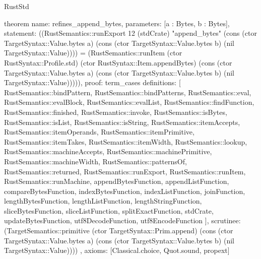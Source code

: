 \begin{lexlean}{RustStd}
\begin{semanticmodule}
theorem{
  name: refines_append_bytes,
  parameters: [a : Bytes, b : Bytes],
  statement: ((RustSemantics::runExport 12 (stdCrate) "append_bytes" (cons (ctor TargetSyntax::Value.bytes a) (cons (ctor TargetSyntax::Value.bytes b) (nil TargetSyntax::Value)))) = (RustSemantics::runItem (ctor RustSyntax::Profile.std) (ctor RustSyntax::Item.appendBytes) (cons (ctor TargetSyntax::Value.bytes a) (cons (ctor TargetSyntax::Value.bytes b) (nil TargetSyntax::Value))))),
  proof: term_cases{
    definitions: [
      RustSemantics::bindPattern,
      RustSemantics::bindPatterns,
      RustSemantics::eval,
      RustSemantics::evalBlock,
      RustSemantics::evalList,
      RustSemantics::findFunction,
      RustSemantics::finished,
      RustSemantics::invoke,
      RustSemantics::isBytes,
      RustSemantics::isList,
      RustSemantics::isString,
      RustSemantics::itemAccepts,
      RustSemantics::itemOperands,
      RustSemantics::itemPrimitive,
      RustSemantics::itemTakes,
      RustSemantics::itemWidth,
      RustSemantics::lookup,
      RustSemantics::machineAccepts,
      RustSemantics::machinePrimitive,
      RustSemantics::machineWidth,
      RustSemantics::patternsOf,
      RustSemantics::returned,
      RustSemantics::runExport,
      RustSemantics::runItem,
      RustSemantics::runMachine,
      appendBytesFunction,
      appendListFunction,
      compareBytesFunction,
      indexBytesFunction,
      indexListFunction,
      joinFunction,
      lengthBytesFunction,
      lengthListFunction,
      lengthStringFunction,
      sliceBytesFunction,
      sliceListFunction,
      splitExactFunction,
      stdCrate,
      updateBytesFunction,
      utf8DecodeFunction,
      utf8EncodeFunction
    ],
    scrutinee: (TargetSemantics::primitive (ctor TargetSyntax::Prim.append) (cons (ctor TargetSyntax::Value.bytes a) (cons (ctor TargetSyntax::Value.bytes b) (nil TargetSyntax::Value))))
  },
  axioms: [Classical.choice, Quot.sound, propext]
}


\end{semanticmodule}
\end{lexlean}
